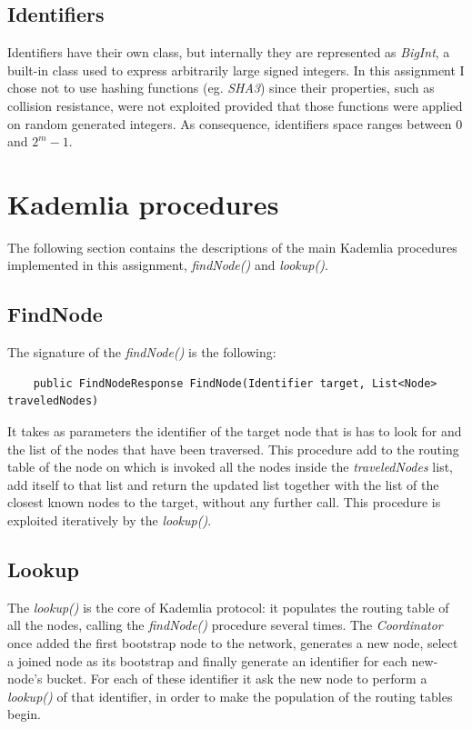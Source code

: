 \documentclass[12pt]{article}
\begin{document}
\subsection{Identifiers}

Identifiers have their own class, but internally they are represented as \textit{BigInt}, a built-in class used to express arbitrarily large signed integers. In this assignment I chose not to use hashing functions (eg. \textit{SHA3}) since their properties, such as collision resistance, were not exploited provided that those functions were applied on random generated integers.
As consequence, identifiers space ranges between $0$ and $2^m - 1$.

\section{Kademlia procedures}

The following section contains the descriptions of the main Kademlia procedures implemented in this assignment, \textit{findNode()} and \textit{lookup()}.

\subsection{FindNode}
The signature of the \textit{findNode()} is the following:
\begin{verbatim}
    public FindNodeResponse FindNode(Identifier target, List<Node> traveledNodes)
\end{verbatim}
It takes as parameters the identifier of the target node that is has to look for and the list of the nodes that have been traversed. This procedure add to the routing table of the node on which is invoked all the nodes inside the \textit{traveledNodes} list, add itself to that list and return the updated list together with the list of the closest known nodes to the target, without any further call. This procedure is exploited iteratively by the \textit{lookup()}.

\subsection{Lookup}

The \textit{lookup()} is the core of Kademlia protocol: it populates the routing table of all the nodes, calling the \textit{findNode()} procedure several times. The \textit{Coordinator} once added the first bootstrap node to the network, generates a new node, select a joined node as its bootstrap and finally generate an identifier for each new-node's bucket. For each of these identifier it ask the new node to perform a \textit{lookup()} of that identifier, in order to make the population of the routing tables begin. \\
\end{document}
